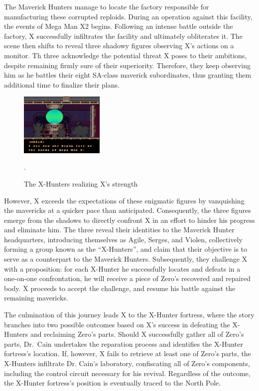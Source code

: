  The Maverick Hunters manage to locate the factory responsible for manufacturing these corrupted reploids. During an operation against this facility, the events of Mega Man X2 begins. Following an intense battle outside the factory, X successfully infiltrates the facility  and ultimately obliterates it. The scene then shifts to reveal three shadowy figures observing X's actions on a monitor. Th three acknowledge the potential threat X poses to their ambitions, despite remaining firmly sure of their superiority. Therefore, they keep observing him as he battles their eight SA-class maverick subordinates, thus granting them additional time to finalize their plans. 
\begin{figure}[htp]
	\centering
	\includegraphics[height=3cm]{figures/X2/story_2.jpg}
	\caption {The X-Hunters realizing X's strength}.
\end{figure}
However, X exceeds the expectations of these enigmatic figures by vanquishing the mavericks at a quicker pace than anticipated. Consequently, the three figures emerge from the shadows to directly confront X in an effort to hinder his progress and eliminate him. The three reveal their identities to the Maverick Hunter headquarters, introducing themselves as Agile, Serges, and Violen, collectively forming a group known as the ``X-Hunters'', and claim that their objective is to serve as a counterpart to the Maverick Hunters. Subsequently, they challenge X with a proposition: for each X-Hunter he successfully locates and defeats in a one-on-one confrontation, he will receive a piece of Zero's recovered and repaired body. X proceeds to accept the challenge, and resume his battle against the remaining mavericks.

The culmination of this journey leads X to the X-Hunter fortress, where the story branches into two possible outcomes based on X's success in defeating the X-Hunters and reclaiming Zero's parts. Should X successfully gather all of Zero's parts, Dr.~Cain undertakes the reparation process and identifies the X-Hunter fortress's location. If, however, X fails to retrieve at least one of Zero's parts, the X-Hunters infiltrate Dr. Cain's laboratory, confiscating all of Zero's components, including the control circuit necessary for his revival. Regardless of the outcome, the X-Hunter fortress's position is eventually traced to the North Pole.

